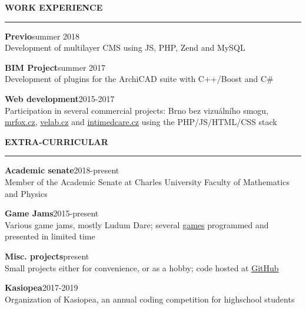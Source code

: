 \documentclass[11pt,a4paper]{article} %
\newcommand{\hSection}[1]{
    \medskip
    \MakeUppercase{\bf #1}
    \medskip
    \hrule
}
\newcommand{\hSubsection}[2]{{\bf #1}\hfill {#2}}
\begin{document}
\vspace{-0.5cm}
\hSection{Work Experience}
\hSubsection{Previo}{summer 2018} \\
Development of multilayer CMS using JS, PHP, Zend and MySQL

\hSubsection{BIM Project}{summer 2017} \\
Development of plugins for the ArchiCAD suite with C++/Boost and C\#

\hSubsection{Web development}{2015-2017} \\
Participation in several commercial projects: Brno bez vizuálního smogu, \href{https://www.mrfox.cz/}{mrfox.cz}, \href{http://www.velab.cz/}{velab.cz} and \href{http://www.intimedcare.cz/}{intimedcare.cz} using the PHP/JS/HTML/CSS stack

\hSection{Extra-Curricular}
\hSubsection{Academic senate}{2018-present} \\
Member of the Academic Senate at Charles University Faculty of Mathematics and Physics

\hSubsection{Game Jams}{2015-present} \\
Various game jams, mostly Ludum Dare; several \href{https://github.com/allemansratten}{games} programmed and presented in limited time

\hSubsection{Misc. projects}{present} \\
Small projects either for convenience, or as a hobby; code hosted at \href{https://github.com/zouharvi}{GitHub}

\hSubsection{Kasiopea}{2017-2019} \\
Organization of Kasiopea, an annual coding competition for highschool students
\end{document}
